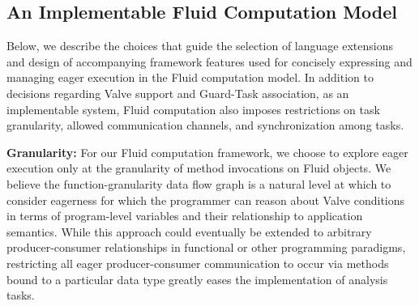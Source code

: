 \vspace{-0.25in}
\subsection{An Implementable Fluid Computation Model}
Below, we describe the choices that guide the selection of language extensions and design of accompanying framework features used for concisely expressing and managing eager execution in the Fluid computation model. In addition to decisions regarding Valve support and Guard-Task association, as an implementable system, Fluid computation also imposes restrictions on task granularity, allowed communication channels, and synchronization among tasks.

\noindent\textbf{Granularity:} For our Fluid computation framework, we choose to explore eager execution only at the granularity of method invocations on Fluid objects. We believe the function-granularity data flow graph is a natural level at which to consider eagerness for which the programmer can reason about Valve conditions in terms of program-level variables and their relationship to application semantics. While this approach could eventually be extended to arbitrary producer-consumer relationships in functional or other programming paradigms, restricting all eager producer-consumer communication to occur via methods bound to a particular data type greatly eases the implementation of analysis tasks.

